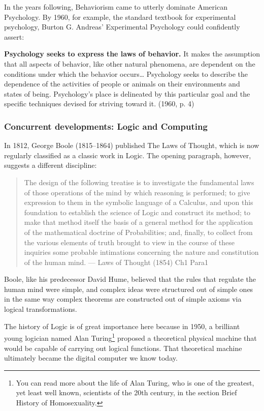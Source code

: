 In the years following, Behaviorism came to utterly dominate American Psychology. By 1960, for example, the standard textbook for experimental psychology, Burton G. Andreas' Experimental Psychology could confidently assert:

\textbf{Psychology seeks to express the laws of behavior.} It makes the assumption that all aspects of behavior, like other natural phenomena, are dependent on the conditions under which the behavior occurs{\ldots} Psychology seeks to describe the dependence of the activities of people or animals on their environments and states of being. Psychology's place is delineated by this particular goal and the specific techniques devised for striving toward it. (1960, p. 4)

\subsubsection{Concurrent developments: Logic and Computing}
\label{concurrentdevelopments:logicandcomputing}

In 1812, George Boole (1815--1864) published The Laws of Thought, which is now regularly classified as a classic work in Logic. The opening paragraph, however, suggests a different discipline:

\begin{quote}

The design of the following treatise is to investigate the fundamental laws of those operations of the mind by which reasoning is performed; to give expression to them in the symbolic language of a Calculus, and upon this foundation to establish the science of Logic and construct its method; to make that method itself the basis of a general method for the application of the mathematical doctrine of Probabilities; and, finally, to collect from the various elements of truth brought to view in the course of these inquiries some probable intimations concerning the nature and constitution of the human mind. --- Laws of Thought (1854) Ch1 Para1
\end{quote}

Boole, like his predecessor David Hume, believed that the rules that regulate the human mind were simple, and complex ideas were structured out of simple ones in the same way complex theorems are constructed out of simple axioms via logical transformations.

The history of Logic is of great importance here because in 1950, a brilliant young logician named Alan Turing\footnote{You can read more about the life of Alan Turing, who is one of the greatest, yet least well known, scientists of the 20th century, in the section Brief History of Homosexuality.} proposed a theoretical physical machine that would be capable of carrying out logical functions. That theoretical machine ultimately became the digital computer we know today.

